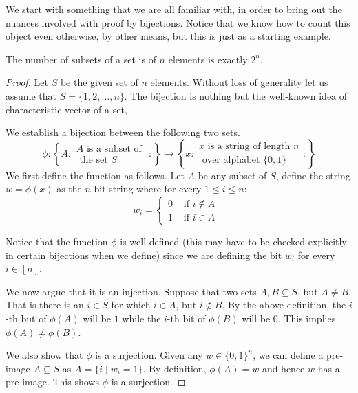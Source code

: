 We start with something that we are all familiar with, in order to bring out the nuances involved with proof by bijections. Notice that we know how to count this object even otherwise, by other means, but this is just as a starting example.

\begin{proposition}
The number of subsets of a set is of $n$ elements is exactly $2^n$.
\end{proposition}
\begin{proof}
Let $S$ be the given set of $n$ elements. Without loss of generality let us assume that $S = \{1,2,\ldots, n\}$. The bijection is nothing but the well-known idea of characteristic vector of a set,

We establish a bijection between the following two sets.
$$ \phi : \left\{ A : \begin{array}{c} A \textrm{ is a subset of } \\ \textrm{ the set $S$ } \end{array} : \right\} \to \left\{ x : \begin{array}{c} x \textrm{ is a string of length $n$} \\ \textrm{ over alphabet $\{0,1\}$ } \end{array} : \right\}$$
We first define the function as follows. Let $A$ be any subset of $S$, define the string $w = \phi(x)$ as the $n$-bit string where for every $1 \le i \le n$:
\[
w_i = 
\begin{cases}
0 & \textrm{ if $i \notin A$ }\\
1 & \textrm{ if $i \in A$ }
\end{cases}
\]

Notice that the function $\phi$ is well-defined (this may have to be checked explicitly in certain bijections when we define) since we are defining the bit $w_i$ for every $i \in [n]$. 

We now argue that it is an injection. Suppose that two sets $A, B \subseteq S$, but $A \ne B$. That is there is an $i \in S$ for which $i \in A$, but $i \notin B$. By the above definition, the $i$-th but of $\phi(A)$ will be $1$ while the $i$-th bit of $\phi(B)$ will be $0$. This implies $\phi(A) \ne \phi(B)$.

We also show that $\phi$ is a surjection. Given any $w \in \{0,1\}^n$, we can define a pre-image $A \subseteq S$ as $A = \{ i \mid w_i = 1 \}$. By definition, $\phi(A) = w$ and hence $w$ has a pre-image. This shows $\phi$ is a surjection.

\end{proof}

